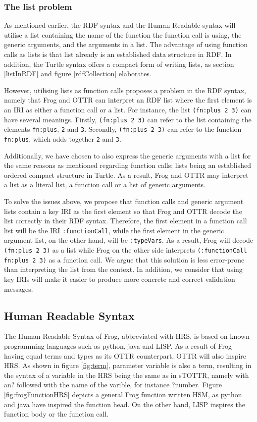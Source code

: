 \subsubsection{The list problem}
\label{theListProblem}
As mentioned earlier, the RDF syntax and the Human Readable syntax will utilise a list containing the name of the function the function call is using, the generic arguments, and the arguments in a list. The advantage of using function calls as lists is that list already is an established data structure in RDF. In addition, the Turtle syntax offers a compact form of writing lists, as section \ref{listInRDF} and figure \ref{rdfCollection} elaborates. 

\para
However, utilising lists as function calls proposes a problem in the RDF syntax, namely that Frog and OTTR can interpret an RDF list where the first element is an IRI as either a function call or a list. For instance, the list \lstinline{(fn:plus 2 3)} can have several meanings. Firstly, \lstinline{(fn:plus 2 3)} can refer to the list containing the elements \lstinline{fn:plus}, \lstinline{2} and \lstinline{3}. Secondly, \lstinline{(fn:plus 2 3)} can refer to the function \lstinline{fn:plus}, which adds together \lstinline{2} and \lstinline{3}.

\para
Additionally, we have chosen to also express the generic arguments with a list for the same reasons as mentioned regarding function calls; lists being an established ordered compact structure in Turtle. As a result, Frog and OTTR may interpret a list as a literal list, a function call or a list of generic arguments.

\para
To solve the issues above, we propose that function calls and generic argument lists contain a key IRI as the first element so that Frog and OTTR decode the list correctly in their RDF syntax. Therefore, the first element in a function call list will be the IRI \lstinline{:functionCall}, while the first element in the generic argument list, on the other hand, will be \lstinline{:typeVars}. As a result, Frog will decode \lstinline{(fn:plus 2 3)} as a list while Frog on the other side interprets \lstinline{(:functionCall fn:plus 2 3)} as a function call. We argue that this solution is less error-prone than interpreting the list from the context. In addition, we consider that using key IRIs will make it easier to produce more concrete and correct validation messages. 

\subsection{Human Readable Syntax}
The Human Readable Syntax of Frog, abbreviated with HRS, is based on known programming languages such as python, java and LISP. As a result of Frog having equal terms and types as its OTTR counterpart, OTTR will also inspire HRS. As shown in figure \ref{fig:term}, parameter variable is also a term, resulting in the syntax of a variable in the HRS being the same as in sTOTTR, namely with an? followed with the name of the varible, for instance ?number.  Figure \ref{fig:frogFunctionHRS} depicts a general Frog function written HSM, as python and java have inspired the function head. On the other hand, LISP inspires the function body or the function call. 

